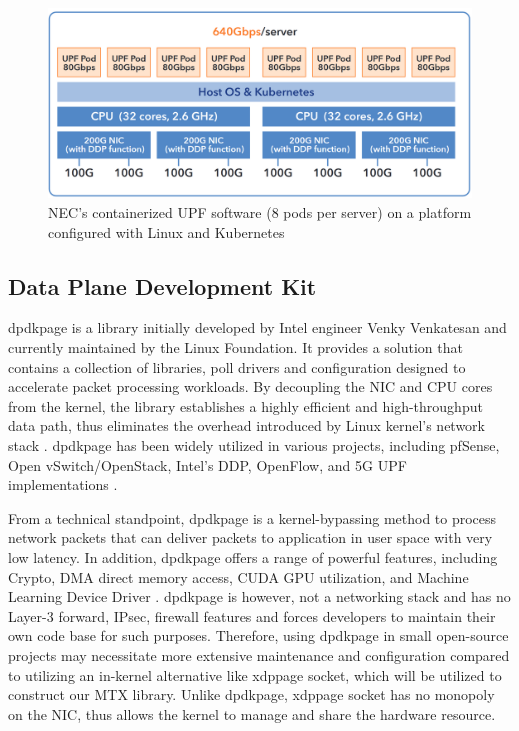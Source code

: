 \begin{figure}[H]
	\centering
	\includegraphics[width=1.0\textwidth]{resources/images/640_nec_upf_system.PNG}
	\caption{NEC's containerized UPF software (8 pods per server) on a platform configured with Linux and Kubernetes \cite{nec_upf_whitepaper}}
    \label{fig:related_work:640_nec_upf_system}
\end{figure}

\subsection{Data Plane Development Kit}
\ac{dpdkpage} is a library initially developed by Intel engineer Venky Venkatesan and currently maintained by the Linux Foundation. 
It provides a solution that contains a collection of libraries, poll drivers and configuration designed to accelerate packet processing workloads. 
By decoupling the NIC and CPU cores from the kernel, the library establishes a highly efficient and high-throughput data path, thus eliminates the overhead introduced by Linux kernel's network stack \cite{kourtis_enhancing_2015}. 
\ac{dpdkpage} has been widely utilized in various projects, including pfSense, Open vSwitch/OpenStack, Intel's DDP, OpenFlow, and 5G UPF implementations \cite{intel_ddp_ethernet_800}\cite{pongracz_removing_2013}\cite{zte_5g_core_upf_impl}\cite{nec_upf_whitepaper}. 

From a technical standpoint, \ac{dpdkpage} is a kernel-bypassing method to process network packets that can deliver packets to application in user space with very low latency.
In addition, \ac{dpdkpage} offers a range of powerful features, including Crypto, DMA direct memory access, CUDA GPU utilization, and Machine Learning Device Driver \cite{dpdk_guide_page}. 
\ac{dpdkpage} is however, not a networking stack and has no Layer-3 forward, IPsec, firewall features \cite{old_dpdk_page} and forces developers to maintain their own code base for such purposes.
Therefore, using \ac{dpdkpage} in small open-source projects may necessitate more extensive maintenance and configuration compared to utilizing an in-kernel alternative like \ac{xdppage} socket, which will be utilized to construct our MTX library.
Unlike \ac{dpdkpage}, \ac{xdppage} socket has no monopoly on the \ac{NIC}, thus allows the kernel to manage and share the hardware resource.

